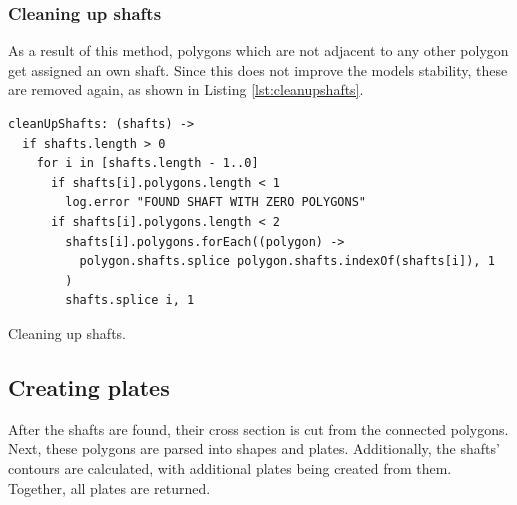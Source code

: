 \documentclass[../ClassicThesis.tex]{subfiles}
\begin{document}
\subsubsection{Cleaning up shafts}

As a result of this method, polygons which are not adjacent to any other polygon get assigned an own shaft. Since this does not improve the models stability, these are removed again, as shown in Listing \ref{lst:cleanupshafts}.

\begin{listing}
\begin{verbatim}
cleanUpShafts: (shafts) ->
  if shafts.length > 0
    for i in [shafts.length - 1..0]
      if shafts[i].polygons.length < 1
        log.error "FOUND SHAFT WITH ZERO POLYGONS"
      if shafts[i].polygons.length < 2
        shafts[i].polygons.forEach((polygon) ->
          polygon.shafts.splice polygon.shafts.indexOf(shafts[i]), 1
        )
        shafts.splice i, 1
\end{verbatim}
\caption{Cleaning up shafts.}
\label{lst:cleanupshafts}
\end{listing}

\subsection{Creating plates}

After the shafts are found, their cross section is cut from the connected polygons. Next, these polygons are parsed into shapes and plates. Additionally, the shafts' contours are calculated, with additional plates being created from them. Together, all plates are returned.
\end{document}
